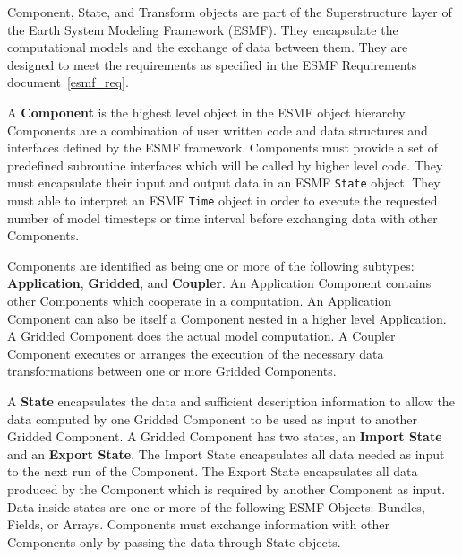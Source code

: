 %


Component, State, and Transform objects are part of the Superstructure 
layer of the Earth System Modeling Framework (ESMF).  They encapsulate
the computational models and the exchange of data between them.
They are designed to meet the requirements as specified in the
ESMF Requirements document~\ref{esmf_req}.

A {\bf Component} 
is the highest level object in the ESMF object
hierarchy.  Components are a combination of user written code and
data structures and interfaces defined by the ESMF framework.
Components must provide a set of predefined subroutine interfaces
which will be called by higher level code.  They must encapsulate
their input and output data in an ESMF {\tt State} object.  They
must able to interpret an ESMF {\tt Time} object in order
to execute the requested number of model timesteps or time interval
before exchanging data with other Components.

Components are identified as being one or more of the
following subtypes: {\bf Application}, {\bf Gridded}, and {\bf Coupler}.  
An Application Component contains other Components which
cooperate in a computation. An Application Component can also be itself a
Component nested in a higher level Application.  A Gridded Component
does the actual model computation.  A Coupler Component executes or
arranges the execution of the necessary data transformations between one
or more Gridded Components.


A {\bf State} 
encapsulates the data and sufficient description information
to allow the data computed by one Gridded Component to be
used as input to another Gridded Component.  A Gridded Component has
two states, an {\bf Import State} and an {\bf Export State}.
The Import State encapsulates all data needed as input to the
next run of the Component.  The Export State encapsulates all
data produced by the Component which is required by another
Component as input.  Data inside states are one or more of
the following ESMF Objects: Bundles, Fields, or Arrays.
Components must exchange information with other Components
only by passing the data through State objects.

